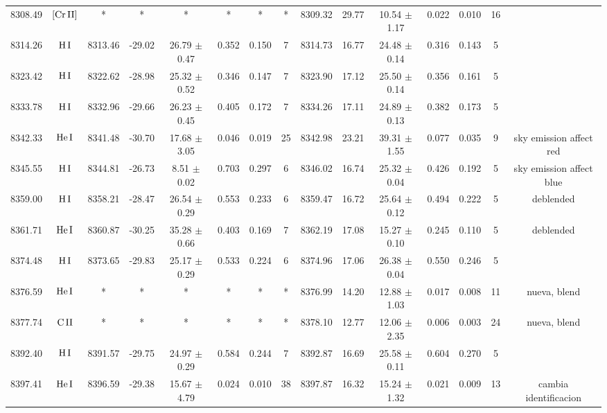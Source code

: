 \documentclass{article}
\begin{document}
\begin{table*}
\begin{adjustbox}{width=\textwidth}
\begin{tabular}{ccccccccccccccc}
8308.49 & $\mbox{[Cr}\thinspace \mbox{II]}$ & * & * & * & * & * & * & 8309.32 & 29.77 & 10.54 $\pm$ 1.17 & 0.022 & 0.010 & 16 &  \\
8314.26 & $\mbox{H}\thinspace \mbox{I}$ & 8313.46 & -29.02 & 26.79 $\pm$ 0.47 & 0.352 & 0.150 & 7 & 8314.73 & 16.77 & 24.48 $\pm$ 0.14 & 0.316 & 0.143 & 5 &  \\
8323.42 & $\mbox{H}\thinspace \mbox{I}$ & 8322.62 & -28.98 & 25.32 $\pm$ 0.52 & 0.346 & 0.147 & 7 & 8323.90 & 17.12 & 25.50 $\pm$ 0.14 & 0.356 & 0.161 & 5 &  \\
8333.78 & $\mbox{H}\thinspace \mbox{I}$ & 8332.96 & -29.66 & 26.23 $\pm$ 0.45 & 0.405 & 0.172 & 7 & 8334.26 & 17.11 & 24.89 $\pm$ 0.13 & 0.382 & 0.173 & 5 &  \\
8342.33 & $\mbox{He}\thinspace \mbox{I}$ & 8341.48 & -30.70 & 17.68 $\pm$ 3.05 & 0.046 & 0.019 & 25 & 8342.98 & 23.21 & 39.31 $\pm$ 1.55 & 0.077 & 0.035 & 9 &  sky emission affect red \\
8345.55 & $\mbox{H}\thinspace \mbox{I}$ & 8344.81 & -26.73 & 8.51 $\pm$ 0.02 & 0.703 & 0.297 & 6 & 8346.02 & 16.74 & 25.32 $\pm$ 0.04 & 0.426 & 0.192 & 5 &  sky emission affect blue \\
8359.00 & $\mbox{H}\thinspace \mbox{I}$ & 8358.21 & -28.47 & 26.54 $\pm$ 0.29 & 0.553 & 0.233 & 6 & 8359.47 & 16.72 & 25.64 $\pm$ 0.12 & 0.494 & 0.222 & 5 &  deblended \\
8361.71 & $\mbox{He}\thinspace \mbox{I}$ & 8360.87 & -30.25 & 35.28 $\pm$ 0.66 & 0.403 & 0.169 & 7 & 8362.19 & 17.08 & 15.27 $\pm$ 0.10 & 0.245 & 0.110 & 5 &  deblended \\
8374.48 & $\mbox{H}\thinspace \mbox{I}$ & 8373.65 & -29.83 & 25.17 $\pm$ 0.29 & 0.533 & 0.224 & 6 & 8374.96 & 17.06 & 26.38 $\pm$ 0.04 & 0.550 & 0.246 & 5 &  \\
8376.59 & $\mbox{He}\thinspace \mbox{I}$ & * & * & * & * & * & * & 8376.99 & 14.20 & 12.88 $\pm$ 1.03 & 0.017 & 0.008 & 11 &  nueva, blend \\
8377.74 & $\mbox{C}\thinspace \mbox{II}$ & * & * & * & * & * & * & 8378.10 & 12.77 & 12.06 $\pm$ 2.35 & 0.006 & 0.003 & 24 &  nueva, blend \\
8392.40 & $\mbox{H}\thinspace \mbox{I}$ & 8391.57 & -29.75 & 24.97 $\pm$ 0.29 & 0.584 & 0.244 & 7 & 8392.87 & 16.69 & 25.58 $\pm$ 0.11 & 0.604 & 0.270 & 5 &  \\
8397.41 & $\mbox{He}\thinspace \mbox{I}$ & 8396.59 & -29.38 & 15.67 $\pm$ 4.79 & 0.024 & 0.010 & 38 & 8397.87 & 16.32 & 15.24 $\pm$ 1.32 & 0.021 & 0.009 & 13 &  cambia identificacion \\

\end{tabular}
\end{adjustbox}
\end{table*}
\end{document}
